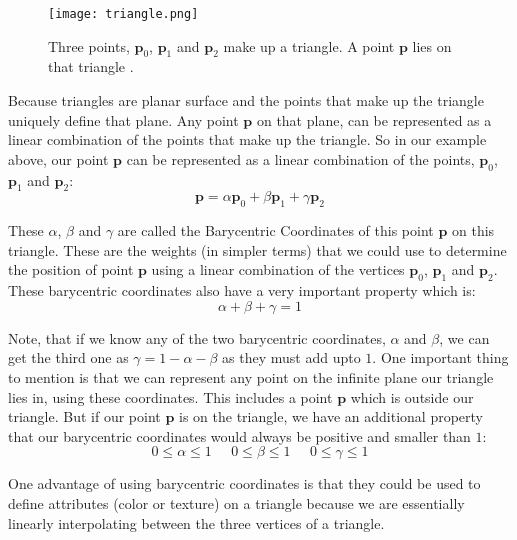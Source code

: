 \documentclass[11pt,a4paper]{article}
\begin{document}
	\begin{figure}[H]
		\centering
		\texttt{[image: triangle.png]}
		\caption{\centering Three points, $\boldsymbol{p}_{0}$, $\boldsymbol{p}_{1}$ and $\boldsymbol{p}_{2}$ make up a triangle. A point $\boldsymbol{p}$ lies on that triangle \protect\cite{trianglemeshes}.}
	\end{figure}
	
	\noindent
	Because triangles are planar surface and the points that make up the triangle uniquely define that plane. Any point $\boldsymbol{p}$ on that plane, can be represented as a linear combination of the points that make up the triangle. So in our example above, our point $\boldsymbol{p}$ can be represented as a linear combination of the points, $\boldsymbol{p}_{0}$, $\boldsymbol{p}_{1}$ and $\boldsymbol{p}_{2}$:
	\begin{equation}
		\boldsymbol{p} = \alpha \boldsymbol{p}_{0} + \beta \boldsymbol{p}_{1} + \gamma \boldsymbol{p}_{2}
	\end{equation}
	
	\noindent
	These $\alpha$, $\beta$ and $\gamma$ are called the Barycentric Coordinates of this point $\boldsymbol{p}$ on this triangle. These are the weights (in simpler terms) that we could use to determine the position of point $\boldsymbol{p}$ using a linear combination of the vertices $\boldsymbol{p}_{0}$, $\boldsymbol{p}_{1}$ and $\boldsymbol{p}_{2}$. These barycentric coordinates also have a very important property which is:
	\begin{equation}
		\alpha + \beta + \gamma = 1
	\end{equation}
	
	\noindent
	Note, that if we know any of the two barycentric coordinates, $\alpha$ and $\beta$, we can get the third one as $\gamma = 1 - \alpha - \beta$ as they must add upto $1$. One important thing to mention is that we can represent any point on the infinite plane our triangle lies in, using these coordinates. This includes a point $\boldsymbol{p}$ which is outside our triangle. But if our point $\boldsymbol{p}$ is on the triangle, we have an additional property that our barycentric coordinates would always be positive and smaller than $1$:
	\begin{equation}
		0 \le \alpha \le 1 \;\;\;\;\; 0 \le \beta \le 1 \;\;\;\;\; 0 \le \gamma \le 1
	\end{equation}
	
	\noindent
	One advantage of using barycentric coordinates is that they could be used to define attributes (color or texture) on a triangle because we are essentially linearly interpolating between the three vertices of a triangle.
	
\end{document}
